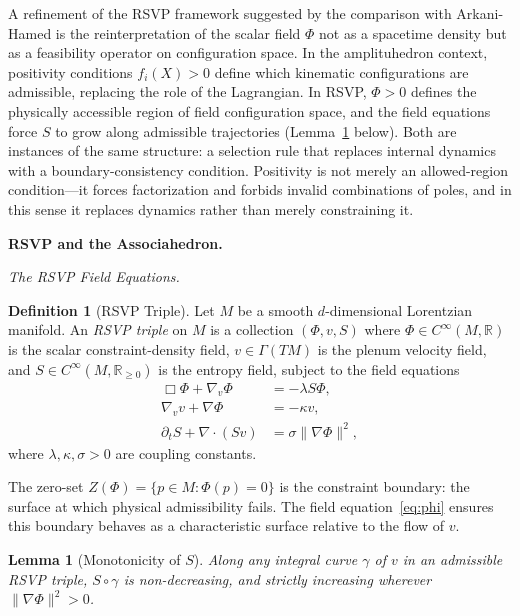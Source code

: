 \documentclass[11pt]{article}
\theoremstyle{plain}
\newtheorem{lemma}[theorem]{Lemma}
\theoremstyle{definition}
\newtheorem{definition}[theorem]{Definition}
\theoremstyle{remark}
\newcommand{\R}{\mathbb{R}}
\newcommand{\Phif}{\Phi}
\newcommand{\vf}{v}
\newcommand{\Sf}{S}
\begin{document}
A refinement of the RSVP framework suggested by the comparison with Arkani-Hamed is the reinterpretation of the scalar field $\Phif$ not as a spacetime density but as a feasibility operator on configuration space. In the amplituhedron context, positivity conditions $f_i(X) > 0$ define which kinematic configurations are admissible, replacing the role of the Lagrangian. In RSVP, $\Phif > 0$ defines the physically accessible region of field configuration space, and the field equations force $\Sf$ to grow along admissible trajectories (Lemma~\ref{lem:S-monotone} below). Both are instances of the same structure: a selection rule that replaces internal dynamics with a boundary-consistency condition. Positivity is not merely an allowed-region condition---it forces factorization and forbids invalid combinations of poles, and in this sense it replaces dynamics rather than merely constraining it.

\bigskip\noindent\textbf{RSVP and the Associahedron.}
\label{sec:rsvp}

\medskip\noindent\textit{The RSVP Field Equations.}

\begin{definition}[RSVP Triple]
Let $M$ be a smooth $d$-dimensional Lorentzian manifold. An \emph{RSVP triple} on $M$ is a collection $(\Phif, \vf, \Sf)$ where $\Phif \in C^\infty(M, \R)$ is the scalar constraint-density field, $\vf \in \Gamma(TM)$ is the plenum velocity field, and $\Sf \in C^\infty(M, \R_{\geq 0})$ is the entropy field, subject to the field equations
\begin{align}
  \Box \Phif + \nabla_\vf \Phif &= -\lambda \Sf \Phif, \label{eq:phi}\\
  \nabla_\vf \vf + \nabla \Phif &= -\kappa \vf, \label{eq:v}\\
  \partial_t \Sf + \nabla \cdot (\Sf \vf) &= \sigma \|\nabla \Phif\|^2, \label{eq:S}
\end{align}
where $\lambda, \kappa, \sigma > 0$ are coupling constants.
\end{definition}

The zero-set $Z(\Phif) = \{p \in M : \Phif(p) = 0\}$ is the constraint boundary: the surface at which physical admissibility fails. The field equation~\eqref{eq:phi} ensures this boundary behaves as a characteristic surface relative to the flow of $\vf$.

\begin{lemma}[Monotonicity of $\Sf$]
\label{lem:S-monotone}
Along any integral curve $\gamma$ of $\vf$ in an admissible RSVP triple, $\Sf \circ \gamma$ is non-decreasing, and strictly increasing wherever $\|\nabla\Phif\|^2 > 0$.
\end{lemma}
\end{document}
